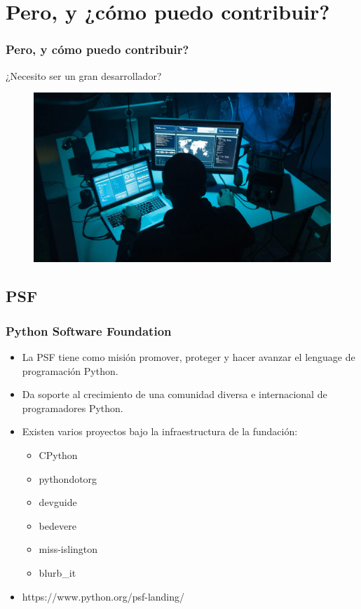 \documentclass[spanish]{beamer}
\begin{document}
\section{Pero, y ¿cómo puedo contribuir?}
\begin{frame}
	\frametitle{Pero, y cómo puedo contribuir?}
	¿Necesito ser un gran desarrollador? 
        \begin{figure}
		\centering
		\includegraphics[width=1\linewidth]{image1.jpg}
	\end{figure}
\end{frame}

\subsection{PSF}
\begin{frame}
	\frametitle{Python Software Foundation}
	\begin{itemize}
		\item La PSF tiene como misión promover, proteger y hacer avanzar el 
			lenguage de programación Python.
		\item Da soporte al crecimiento de una comunidad diversa e internacional
			de programadores Python.
		\item Existen varios proyectos bajo la infraestructura de la fundación:
			\begin{itemize}
				\item CPython
				\item pythondotorg
				\item devguide
				\item bedevere
				\item miss-islington
				\item blurb\_it
			\end{itemize}
		\item https://www.python.org/psf-landing/
	\end{itemize}
\end{frame}
\end{document}
